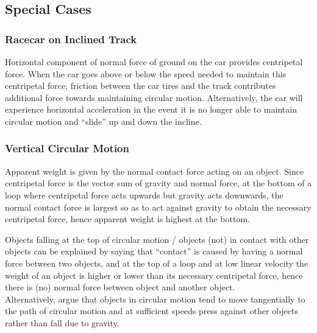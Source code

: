 \documentclass[../main]{subfiles}
\begin{document}

	\subsection{Special Cases}

	\subsubsection{Racecar on Inclined Track}

	Horizontal component of normal force of ground on the car provides centripetal force. When the car goes above or below the speed needed to maintain this centripetal force, friction between the car tires and the track contributes additional force towards maintaining circular motion. Alternatively, the car will experience horizontal acceleration in the event it is no longer able to maintain circular motion and ``slide'' up and down the incline.

	\subsubsection{Vertical Circular Motion}

	Apparent weight is given by the normal contact force acting on an object. Since centripetal force is the vector sum of gravity and normal force, at the bottom of a loop where centripetal force acts upwards but gravity acts downwards, the normal contact force is largest so as to act against gravity to obtain the necessary centripetal force, hence apparent weight is highest at the bottom.

	Objects falling at the top of circular motion / objects (not) in contact with other objects can be explained by saying that ``contact'' is caused by having a normal force between two objects, and at the top of a loop and at low linear velocity the weight of an object is higher or lower than its necessary centripetal force, hence there is (no) normal force between object and another object. \\

	Alternatively, argue that objects in circular motion tend to move tangentially to the path of circular motion and at sufficient speeds press against other objects rather than fall due to gravity.
\end{document}
